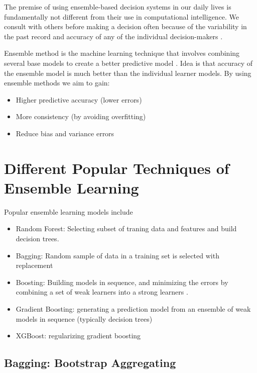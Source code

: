 \documentclass{article}
\begin{document}
The premise of using ensemble-based decision systems in our daily lives is fundamentally not different from their use in computational intelligence. We consult with others before making a decision often because of the variability in the past record and accuracy of any of the individual decision-makers \cite{martin_2018}.

Ensemble method is the machine learning technique that involves combining several base models to create a better predictive model \cite{Wikipedia_2021_ensemble} \cite{Zhang2012EnsembleML}. Idea is that accuracy of the ensemble model is much better than the individual learner models. By using ensemble methods we aim to gain:


\begin{itemize}
    \item Higher predictive accuracy (lower errors)
    \item More consistency (by avoiding overfitting)
    \item Reduce bias and variance errors
\end{itemize}

\section{Different Popular Techniques of Ensemble Learning}

Popular ensemble learning models include

\begin{itemize}
    \item Random Forest: Selecting subset of traning data and features and build decision trees. 
    \item Bagging: Random sample of data in a training set is selected with replacement
    \item Boosting: Building models in sequence, and minimizing the errors by combining a set of weak learners into a strong learners \cite{wikipedia_2021}. 
    \item Gradient Boosting: generating a prediction model from an ensemble of weak models in sequence (typically decision trees)
    \item XGBoost: regularizing gradient boosting \cite{enwiki:1035329027} \cite{chen_guestrin_2016}
\end{itemize}


\subsection{Bagging: Bootstrap Aggregating}
\end{document}
